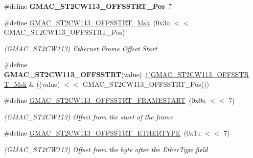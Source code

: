 \begin{DoxyCompactItemize}
\item 
\mbox{\label{group__SAMV71__GMAC_ga3569e6937c2a581779e794883d8191b6}} 
\#define {\bfseries G\+M\+A\+C\+\_\+\+S\+T2\+C\+W113\+\_\+\+O\+F\+F\+S\+S\+T\+R\+T\+\_\+\+Pos}~7
\item 
\mbox{\label{group__SAMV71__GMAC_ga7fec80b0703ca994f3b8745a0ada2283}} 
\#define \mbox{\hyperlink{group__SAMV71__GMAC_ga7fec80b0703ca994f3b8745a0ada2283}{G\+M\+A\+C\+\_\+\+S\+T2\+C\+W113\+\_\+\+O\+F\+F\+S\+S\+T\+R\+T\+\_\+\+Msk}}~(0x3u $<$$<$ G\+M\+A\+C\+\_\+\+S\+T2\+C\+W113\+\_\+\+O\+F\+F\+S\+S\+T\+R\+T\+\_\+\+Pos)
\begin{DoxyCompactList}\small\item\em (G\+M\+A\+C\+\_\+\+S\+T2\+C\+W113) Ethernet Frame Offset Start \end{DoxyCompactList}\item 
\mbox{\label{group__SAMV71__GMAC_gab8330db368b0feab50274657c89ca80d}} 
\#define {\bfseries G\+M\+A\+C\+\_\+\+S\+T2\+C\+W113\+\_\+\+O\+F\+F\+S\+S\+T\+RT}(value)~((\mbox{\hyperlink{group__SAMV71__GMAC_ga7fec80b0703ca994f3b8745a0ada2283}{G\+M\+A\+C\+\_\+\+S\+T2\+C\+W113\+\_\+\+O\+F\+F\+S\+S\+T\+R\+T\+\_\+\+Msk}} \& ((value) $<$$<$ G\+M\+A\+C\+\_\+\+S\+T2\+C\+W113\+\_\+\+O\+F\+F\+S\+S\+T\+R\+T\+\_\+\+Pos)))
\item 
\mbox{\label{group__SAMV71__GMAC_ga270a8023e0036da1054c834b36124234}} 
\#define \mbox{\hyperlink{group__SAMV71__GMAC_ga270a8023e0036da1054c834b36124234}{G\+M\+A\+C\+\_\+\+S\+T2\+C\+W113\+\_\+\+O\+F\+F\+S\+S\+T\+R\+T\+\_\+\+F\+R\+A\+M\+E\+S\+T\+A\+RT}}~(0x0u $<$$<$ 7)
\begin{DoxyCompactList}\small\item\em (G\+M\+A\+C\+\_\+\+S\+T2\+C\+W113) Offset from the start of the frame \end{DoxyCompactList}\item 
\mbox{\label{group__SAMV71__GMAC_ga68898ec381456064878d06df8f6f1204}} 
\#define \mbox{\hyperlink{group__SAMV71__GMAC_ga68898ec381456064878d06df8f6f1204}{G\+M\+A\+C\+\_\+\+S\+T2\+C\+W113\+\_\+\+O\+F\+F\+S\+S\+T\+R\+T\+\_\+\+E\+T\+H\+E\+R\+T\+Y\+PE}}~(0x1u $<$$<$ 7)
\begin{DoxyCompactList}\small\item\em (G\+M\+A\+C\+\_\+\+S\+T2\+C\+W113) Offset from the byte after the Ether\+Type field \end{DoxyCompactList}\item 

\end{DoxyCompactItemize}

